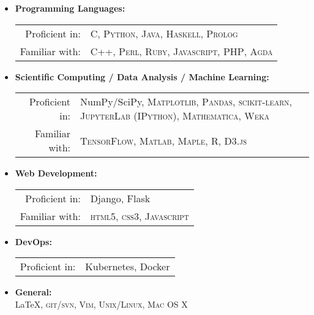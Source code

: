 \documentclass[a4paper,10pt]{article} %
\begin{document}
\begin{itemize}
\item \textbf{Programming Languages:}\\
\begin{tabular}{rl}
Proficient in: & \textsc{C}, \textsc{Python}, \textsc{Java}, \textsc{Haskell}, \textsc{Prolog}\\
Familiar with: & \textsc{C++}, \textsc{Perl}, \textsc{Ruby}, \textsc{Javascript}, \textsc{PHP}, \textsc{Agda}
\end{tabular}
\item \textbf{Scientific Computing / Data Analysis / Machine Learning:}\\
\begin{tabular}{rp{10cm}}
Proficient in: & NumPy/SciPy, \textsc{Matplotlib}, \textsc{Pandas}, \textsc{scikit-learn}, \textsc{JupyterLab (IPython)}, \textsc{Mathematica}, \textsc{Weka} \\
Familiar with: & \textsc{TensorFlow}, \textsc{Matlab}, \textsc{Maple}, \textsc{R}, \textsc{D3.js}
\end{tabular}
\item \textbf{Web Development:}\\
\begin{tabular}{rl}
Proficient in: & Django, Flask\\
Familiar with: & \textsc{html5}, \textsc{css3}, \textsc{Javascript}
\end{tabular}
\item \textbf{DevOps:}\\
\begin{tabular}{rl}
Proficient in: & Kubernetes, Docker\\
\end{tabular}
\item \textbf{General:}\\
\fb \LaTeX, \textsc{git}/\textsc{svn}, \textsc{Vim}, \textsc{Unix/Linux}, \textsc{Mac OS X}
\end{itemize}




\end{document}
